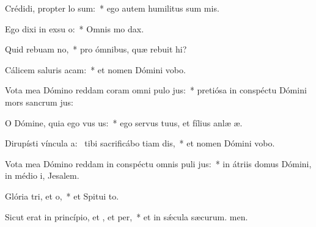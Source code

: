 \item Crédidi, propter  lo sum:~* ego autem humilitus sum mis.
\item Ego dixi in exsu o:~* Omnis mo dax.
\item Quid rebuam no,~* pro ómnibus, quæ rebuit hi?
\item Cálicem saluris acam:~* et nomen Dómini vobo.
\item Vota mea Dómino reddam coram omni pulo jus:~* pretiósa in conspéctu Dómini mors sancrum jus:
\item O Dómine, quia ego vus us:~* ego servus tuus, et fílius anlæ æ.
\item Dirupísti víncula a:~\pscross{} tibi sacrificábo tiam dis,~* et nomen Dómini vobo.
\item Vota mea Dómino reddam in conspéctu omnis puli jus:~* in átriis domus Dómini, in médio i, Jesalem.
\item Glória tri, et o,~* et Spitui to.
\item Sicut erat in princípio, et , et per,~* et in sǽcula sæcurum. men.
